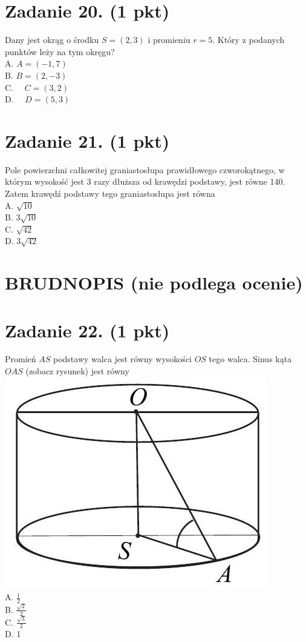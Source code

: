 \documentclass[10pt]{article}
\begin{document}
\section*{Zadanie 20. (1 pkt)}
Dany jest okrąg o środku \(S=(2,3)\) i promieniu \(r=5\). Który z podanych punktów leży na tym okręgu?\\
A. \(A=(-1,7)\)\\
B. \(B=(2,-3)\)\\
C. \(\quad C=(3,2)\)\\
D. \(\quad D=(5,3)\)

\section*{Zadanie 21. (1 pkt)}
Pole powierzchni całkowitej graniastosłupa prawidłowego czworokątnego, w którym wysokość jest 3 razy dłuższa od krawędzi podstawy, jest równe 140. Zatem krawędź podstawy tego graniastosłupa jest równa\\
A. \(\sqrt{10}\)\\
B. \(3 \sqrt{10}\)\\
C. \(\sqrt{42}\)\\
D. \(3 \sqrt{42}\)

\section*{BRUDNOPIS (nie podlega ocenie)}
\section*{Zadanie 22. (1 pkt)}
Promień \(A S\) podstawy walca jest równy wysokości \(O S\) tego walca. Sinus kąta \(O A S\) (zobacz rysunek) jest równy\\
\includegraphics[max width=\textwidth, center]{2024_11_21_ad8c43efe74fa059d24eg-14}\\
A. \(\frac{1}{2}\)\\
B. \(\frac{\sqrt{2}}{2}\)\\
C. \(\frac{\sqrt{3}}{2}\)\\
D. 1
\end{document}

